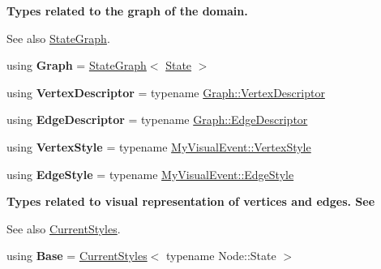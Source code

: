 \begin{Indent}{\bf Types related to the graph of the domain.}\par
{\em \begin{DoxySeeAlso}{See also}
\hyperlink{structStateGraph}{State\+Graph}. 
\end{DoxySeeAlso}
}\begin{DoxyCompactItemize}
\item 
using {\bfseries Graph} = \hyperlink{structStateGraph}{State\+Graph}$<$ \hyperlink{structVisualLog_a5453632aef6fcefb891c07b033fa6b6e}{State} $>$\hypertarget{structVisualLog_a473d007f606db3351b6977787adc2746}{}\label{structVisualLog_a473d007f606db3351b6977787adc2746}

\item 
using {\bfseries Vertex\+Descriptor} = typename \hyperlink{structStateGraph_a95d7ea26b0d0d07d3488068a8e9be53c}{Graph\+::\+Vertex\+Descriptor}\hypertarget{structVisualLog_a31cd5f5744bee5e07413e9955e771fce}{}\label{structVisualLog_a31cd5f5744bee5e07413e9955e771fce}

\item 
using {\bfseries Edge\+Descriptor} = typename \hyperlink{structStateGraph_a419a555605bf486301b84dd6055d81f2}{Graph\+::\+Edge\+Descriptor}\hypertarget{structVisualLog_a90e100550060f33b63ca70267ce9a023}{}\label{structVisualLog_a90e100550060f33b63ca70267ce9a023}

\item 
using {\bfseries Vertex\+Style} = typename \hyperlink{structVisualEvent_aa9a4b26fbfd3265493496f18a5495022}{My\+Visual\+Event\+::\+Vertex\+Style}\hypertarget{structVisualLog_a57cc17ebe569a2fa7e17eb44659db34d}{}\label{structVisualLog_a57cc17ebe569a2fa7e17eb44659db34d}

\item 
using {\bfseries Edge\+Style} = typename \hyperlink{structVisualEvent_ab4aa8ae73e19b337c7f23b39ff9acabf}{My\+Visual\+Event\+::\+Edge\+Style}\hypertarget{structVisualLog_a841bb9cd08127eca2b969c25c625c826}{}\label{structVisualLog_a841bb9cd08127eca2b969c25c625c826}

\end{DoxyCompactItemize}
\end{Indent}
\begin{Indent}{\bf Types related to visual representation of vertices and edges. See}\par
{\em \begin{DoxySeeAlso}{See also}
\hyperlink{structCurrentStyles}{Current\+Styles}. 
\end{DoxySeeAlso}
}\begin{DoxyCompactItemize}
\item 
using {\bfseries Base} = \hyperlink{structCurrentStyles}{Current\+Styles}$<$ typename Node\+::\+State $>$\hypertarget{structVisualLog_a37253d758957cc417d601c301958c49b}{}\label{structVisualLog_a37253d758957cc417d601c301958c49b}

\end{DoxyCompactItemize}
\end{Indent}
